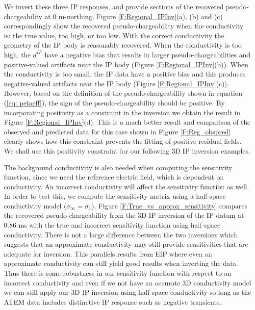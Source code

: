 \documentclass[extra,mreferee]{gji}
\newcommand{\siginf}{\sigma_\infty}
\newcommand{\dip}{d^{IP}}
\begin{document}
We invert these three IP responses, and provide sections of the recovered pseudo-chargeability at 0 m-northing. 
Figure \ref{F:Regional_IPInv}(a), (b) and (c) correspondingly show the recovered pseudo-chargeability when the conductivity is: the true value, too high, or too low.  
With the correct conductivity the geometry of the IP body is reasonably recovered. 
When the conductivity is too high, the $\dip$ have a negative bias that results in larger pseudo-chargeabilities and positive-valued artifacts near the IP body (Figure \ref{F:Regional_IPInv}(b)).  
When the conductivity is too small, the IP data have a positive bias and this produces  negative-valued artifacts near the IP body (Figure \ref{F:Regional_IPInv}(c)). However, based on the  definition of the pseudo-chargeability shown in equation (\ref{eq: petaeff}), the sign of the pseudo-chargeability should be positive. By incorporating positivity as a constraint in the inversion we obtain the result in  Figure \ref{F:Regional_IPInv}(d).  This is a much better result and comparison of the observed and predicted data for this case shown in Figure \ref{F:Reg_obspred} clearly shows how this constraint prevents the fitting of positive residual fields. We shall use this positivity  constraint for our following 3D IP inversion examples. 

The background conductivity is also needed when computing the sensitivity function, since we need the reference electric field, which is dependent on conductivity. 
An incorrect conductivity will affect the sensitivity function as well. 
In order to test this, we compute the sensitivity  matrix using a half-space conductivity model ($\siginf = \sigma_1$). 
Figure \ref{F:True_vs_approx_sensitivity} compares the recovered pseudo-chargeability from the 3D IP inversion of the IP datum at 0.86 ms with the true and incorrect sensitivity function using half-space conductivity. 
There is not a large difference between the two inversions  which suggests that an approximate conductivity may still provide sensitivities that are adequate for inversion. This parallels results from EIP where even an approximate conductivity can still yield good results when inverting the data. Thus there is some robustness in our sensitivity function with respect to an  incorrect conductivity and even if we  not have an accurate 3D conductivity model we can still apply our 3D IP inversion using half-space conductivity so long as the ATEM data includes distinctive IP response such as negative transients.
\end{document}
